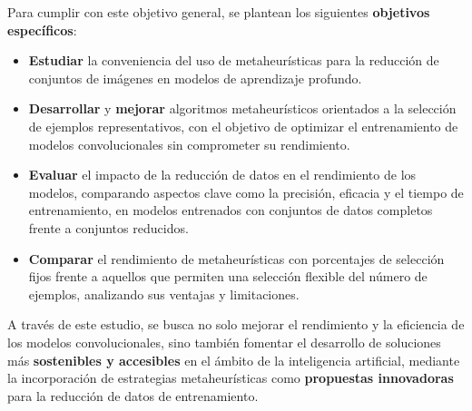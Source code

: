 Para cumplir con este objetivo general, se plantean los siguientes \textbf{objetivos específicos}:

\begin{itemize}
    \item \textbf{Estudiar} la conveniencia del uso de metaheurísticas para la reducción de conjuntos de imágenes 
    en modelos de aprendizaje profundo.
    \item \textbf{Desarrollar} y \textbf{mejorar} algoritmos metaheurísticos orientados a la selección de ejemplos representativos, 
    con el objetivo de optimizar el entrenamiento de modelos convolucionales sin comprometer su rendimiento.
    \item \textbf{Evaluar} el impacto de la reducción de datos en el rendimiento de los modelos, comparando aspectos clave 
    como la precisión, eficacia y el tiempo de entrenamiento, en modelos entrenados con conjuntos de datos completos frente a conjuntos reducidos.
    \item \textbf{Comparar} el rendimiento de metaheurísticas con porcentajes de selección fijos frente a aquellos que 
    permiten una selección flexible del número de ejemplos, analizando sus ventajas y limitaciones.
\end{itemize}

A través de este estudio, se busca no solo mejorar el rendimiento y la eficiencia de los modelos convolucionales, 
sino también fomentar el desarrollo de soluciones más \textbf{sostenibles y accesibles} en el ámbito de la inteligencia artificial, 
mediante la incorporación de estrategias metaheurísticas como \textbf{propuestas innovadoras} para la reducción de datos de entrenamiento.
